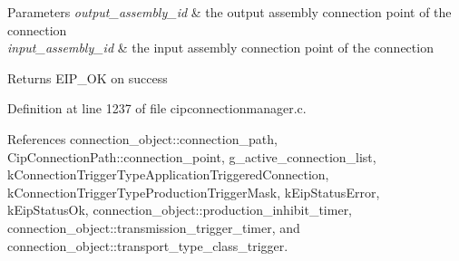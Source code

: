 \begin{DoxyParams}{\-Parameters}
{\em output\-\_\-assembly\-\_\-id} & the output assembly connection point of the connection \\
\hline
{\em input\-\_\-assembly\-\_\-id} & the input assembly connection point of the connection \\
\hline
\end{DoxyParams}
\begin{DoxyReturn}{\-Returns}
\-E\-I\-P\-\_\-\-O\-K on success 
\end{DoxyReturn}


\-Definition at line 1237 of file cipconnectionmanager.\-c.



\-References connection\-\_\-object\-::connection\-\_\-path, \-Cip\-Connection\-Path\-::connection\-\_\-point, g\-\_\-active\-\_\-connection\-\_\-list, k\-Connection\-Trigger\-Type\-Application\-Triggered\-Connection, k\-Connection\-Trigger\-Type\-Production\-Trigger\-Mask, k\-Eip\-Status\-Error, k\-Eip\-Status\-Ok, connection\-\_\-object\-::production\-\_\-inhibit\-\_\-timer, connection\-\_\-object\-::transmission\-\_\-trigger\-\_\-timer, and connection\-\_\-object\-::transport\-\_\-type\-\_\-class\-\_\-trigger.

